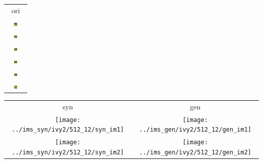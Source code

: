 \documentclass[letter]{article}
\begin{document}
\begin{table}[h!]
	\centering
	\begin{tabular}{c}
		ori\tabularnewline
		\includegraphics[width=0.17\textwidth]{../data/ivy2/512/1} \tabularnewline		\includegraphics[width=0.17\textwidth]{../data/ivy2/512/2} \tabularnewline		\includegraphics[width=0.17\textwidth]{../data/ivy2/512/3} \tabularnewline		\includegraphics[width=0.17\textwidth]{../data/ivy2/512/4} \tabularnewline		\includegraphics[width=0.17\textwidth]{../data/ivy2/512/5} \tabularnewline		\includegraphics[width=0.17\textwidth]{../data/ivy2/512/6} \tabularnewline
	\end{tabular}
	\begin{tabular}{cc}
		syn & gen\tabularnewline
		\texttt{[image: ../ims\_syn/ivy2/512\_12/syn\_im1]} & \texttt{[image: ../ims\_gen/ivy2/512\_12/gen\_im1]} \tabularnewline
		\texttt{[image: ../ims\_syn/ivy2/512\_12/syn\_im2]} & \texttt{[image: ../ims\_gen/ivy2/512\_12/gen\_im2]} \tabularnewline

\end{tabular}
\end{table}
\end{document}

